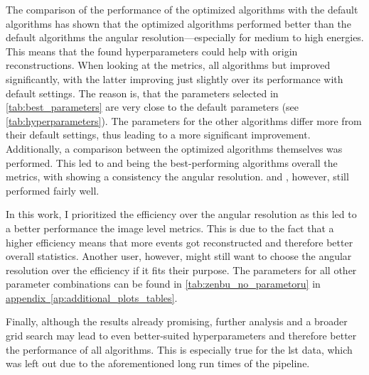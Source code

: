 The comparison of the performance of the optimized algorithms with the default algorithms has shown that
the optimized algorithms performed better than the default algorithms \wrt the angular resolution---especially
for medium to high energies. This means that the found hyperparameters could help with origin reconstructions. When looking at the metrics,
all algorithms but \fact{} improved significantly, with the latter improving just slightly over its performance with default settings.
The reason is, that the parameters selected in \autoref{tab:best_parameters} are very close to the default parameters
(see \autoref{tab:hyperparameters}). The parameters for the other algorithms differ more from their default settings,
thus leading to a more significant improvement. Additionally, a comparison between the optimized algorithms themselves was performed. This led to \fact{} and \mars{}
being the best-performing algorithms overall \wrt the metrics, with \mars{} showing a consistency \wrt the
angular resolution. \tailcuts{} and \tcc{}, however, still performed fairly well.
\vspace{-0.025cm}

In this work, I prioritized the efficiency over the angular resolution as this led to a better
performance \wrt the image level metrics. This is due to the fact that a higher efficiency means
that more events got reconstructed and therefore better overall statistics. Another user, however,
might still want to choose the angular resolution over the efficiency if it fits their purpose.
The parameters for all other parameter combinations can be found in \autoref{tab:zenbu_no_parametoru}
in \hyperref[ap:additional_plots_tables]{appendix~\ref{ap:additional_plots_tables}}.
\vspace{-0.025cm}

Finally, although the results already promising, further analysis and a broader grid search may lead
to even better-suited hyperparameters and therefore better the performance of all algorithms.
This is especially true for the \gls{lst} data, which was left out due to the aforementioned long run times of the pipeline.

\restoregeometry